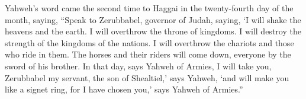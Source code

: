 \begin{paracol}{2}
\begin{otherlanguage}{english}
 Yahweh's word came the second time to Haggai in the
twenty-fourth day of the month, saying,  ``Speak to
Zerubbabel, governor of Judah, saying, `I will shake the heavens and the
earth.  I will overthrow the throne of kingdoms. I will
destroy the strength of the kingdoms of the nations. I will overthrow
the chariots and those who ride in them. The horses and their riders
will come down, everyone by the sword of his brother.  In
that day, says Yahweh of Armies, I will take you, Zerubbabel my servant,
the son of Shealtiel,' says Yahweh, `and will make you like a signet
ring, for I have chosen you,' says Yahweh of Armies.''
\end{otherlanguage} \end{paracol}
